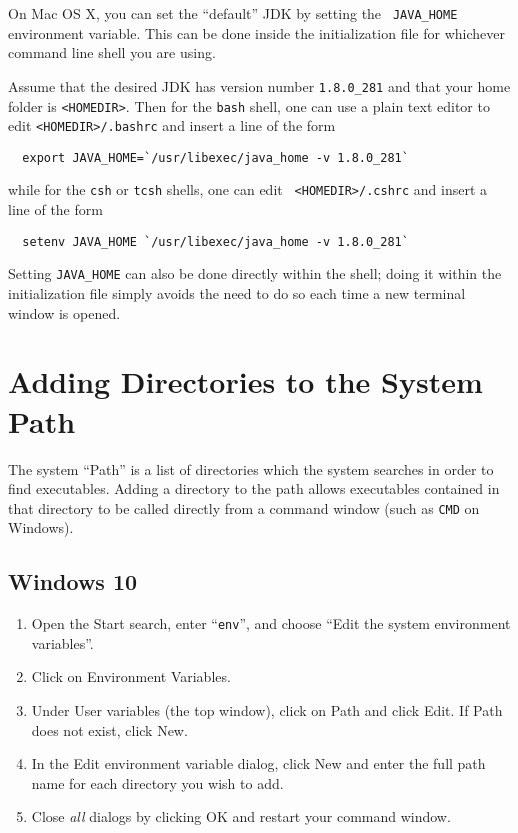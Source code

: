 \documentclass{article}
\begin{document}
On Mac OS X, you can set the ``default'' JDK by setting the {\tt
JAVA\_HOME} environment variable.  This can be done inside the
initialization file for whichever command line shell you are using.

Assume that the desired JDK has version number {\tt 1.8.0\_281} and
that your home folder is {\tt <HOMEDIR>}.  Then for the {\tt bash}
shell, one can use a plain text editor to edit {\tt <HOMEDIR>/.bashrc}
and insert a line of the form
\begin{verbatim}
  export JAVA_HOME=`/usr/libexec/java_home -v 1.8.0_281`
\end{verbatim}
while for the {\tt csh} or {\tt tcsh} shells, one can edit {\tt
<HOMEDIR>/.cshrc} and insert a line of the form
\begin{verbatim}
  setenv JAVA_HOME `/usr/libexec/java_home -v 1.8.0_281`
\end{verbatim}

Setting {\tt JAVA\_HOME} can also be done directly within the shell;
doing it within the initialization file simply avoids the need to do
so each time a new terminal window is opened.

\section{Adding Directories to the System Path}
\label{SettingPath}

The system ``Path'' is a list of directories which the system searches
in order to find executables. Adding a directory to the path allows
executables contained in that directory to be called directly from a
command window (such as {\tt CMD} on Windows).

\subsection*{Windows 10}

\begin{enumerate}

\item Open the {\sf Start} search, enter ``{\tt env}'', and choose
{\sf ``Edit the system environment variables''}.

\item Click on {\sf Environment Variables}.

\item Under {\sf User variables} (the top window), click on {\sf Path}
and click {\sf Edit}. If {\sf Path} does not exist, click {\sf New}.

\item In the {\sf Edit environment variable} dialog, click {\sf New}
and enter the full path name for each directory you wish to add.

\item Close {\it all} dialogs by clicking {\sf OK} and restart 
your command window.

\end{enumerate}
\end{document}
